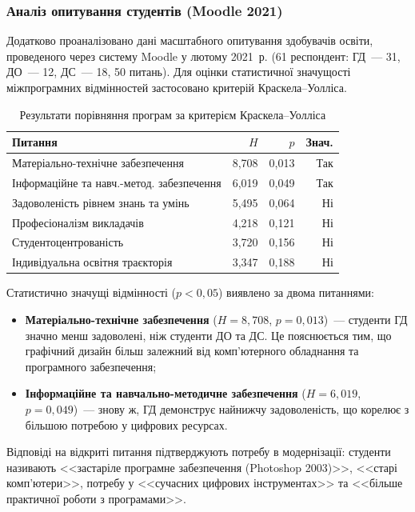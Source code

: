 \subsubsection{Аналіз опитування студентів (Moodle 2021)}\label{sssec:2.2.5}

Додатково проаналізовано дані масштабного опитування здобувачів освіти, проведеного через систему Moodle у лютому 2021~р. (61 респондент: ГД~--- 31, ДО~--- 12, ДС~--- 18, 50 питань). Для оцінки статистичної значущості міжпрограмних відмінностей застосовано критерій Краскела--Уолліса.

\begin{table}[htbp]
\centering
\caption{Результати порівняння програм за критерієм Краскела--Уолліса}\label{tab:kruskal-wallis}
\small
\begin{tabularx}{\textwidth}{@{}p{}rrr@{}}
\toprule
\textbf{Питання} & \textbf{$H$} & \textbf{$p$} & \textbf{Знач.} \\
\midrule
Матеріально-технічне забезпечення & 8,708 & 0,013 & Так \\
Інформаційне та навч.-метод. забезпечення & 6,019 & 0,049 & Так \\
Задоволеність рівнем знань та умінь & 5,495 & 0,064 & Ні \\
Професіоналізм викладачів & 4,218 & 0,121 & Ні \\
Студентоцентрованість & 3,720 & 0,156 & Ні \\
Індивідуальна освітня траєкторія & 3,347 & 0,188 & Ні \\
\bottomrule
\end{tabularx}
\end{table}

Статистично значущі відмінності ($p < 0{,}05$) виявлено за двома питаннями:
\begin{itemize}
    \item \textbf{Матеріально-технічне забезпечення} ($H = 8{,}708$, $p = 0{,}013$)~--- студенти ГД значно менш задоволені, ніж студенти ДО та ДС. Це пояснюється тим, що графічний дизайн більш залежний від комп'ютерного обладнання та програмного забезпечення;
    \item \textbf{Інформаційне та навчально-методичне забезпечення} ($H = 6{,}019$, $p = 0{,}049$)~--- знову ж, ГД демонструє найнижчу задоволеність, що корелює з більшою потребою у цифрових ресурсах.
\end{itemize}

Відповіді на відкриті питання підтверджують потребу в модернізації: студенти називають <<застаріле програмне забезпечення (Photoshop 2003)>>, <<старі комп'ютери>>, потребу у <<сучасних цифрових інструментах>> та <<більше практичної роботи з програмами>>.

